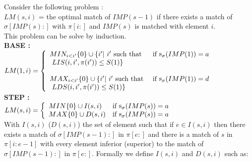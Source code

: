 \documentclass[a4paper]{llncs}
\newcommand{\ptext}{\pi}
\newcommand{\pmotif}{\sigma}
\DeclareMathOperator{\stripea}{s}
\newcommand{\stripe}[2]{\stripea_{{#1}}({#2})}
\newcommand{\dstep}{d}
\newcommand{\ustep}{a}
\begin{document}
			
			Consider the following problem :\\
			$LM(s,i)$ = the optimal match of 	
				$IMP(s-1)$ 
				if there exists a match of $\pmotif[IMP(s):]$ 
				with $\ptext[i:]$
				and $IMP(s)$ 
				is matched with element $i$.\\
				
			This problem can be solve by induction.\\
			
			\textbf{BASE :} \\
			$LM(1,i)= \left\{ 
					\begin{array}{l l}
					
						MIN_{i<i'}\{0\} \cup \{i' |\text{ $i'$ such that } & 
						\text{if $\stripe{\pmotif}{IMP(1)}=\ustep$}
						\\
						\text{ $LIS(i,i',\ptext(i')) \leq S(1)$}\}&\\			


						&\\
						
						MAX_{i<i'}\{0\} \cup \{i' |\text{ $i'$ such that } &
						\text{if $\stripe{\pmotif}{IMP(1)}=\dstep$} \\
						\text{ $LDS(i,i',\ptext(i')) \leq S(1)$}\}&\\			

					\end{array} \right. $\\	
		
			\textbf{STEP :} \\
			$LM(s,i)= \left\{ 
					\begin{array}{l l}
					
						MIN \{0\} \cup  I(s,i) & 
						\text{if $\stripe{\pmotif}{IMP(s)}=\ustep$}\\

						
						MAX \{0\} \cup  D(s,i) & 
						\text{if $\stripe{\pmotif}{IMP(s)}=\ustep$}\\
	
						
											
					\end{array} \right. $\\
					
			With $I(s,i)$ ($D(s,i)$) the set of element such that
			if  $e \in I(s,i)$ then there exists 
			a match of $\pmotif[IMP(s-1):]$ in $\ptext[e:]$ and
			there is a match of $s$ in $\ptext[i:e-1]$
			with every element inferior (superior) to the match of  
			$\pmotif[IMP(s-1):]$ in $\ptext[e:]$.
			Formally we define $I(s,i)$ and $D(s,i)$ such as:\\
			
\end{document}
